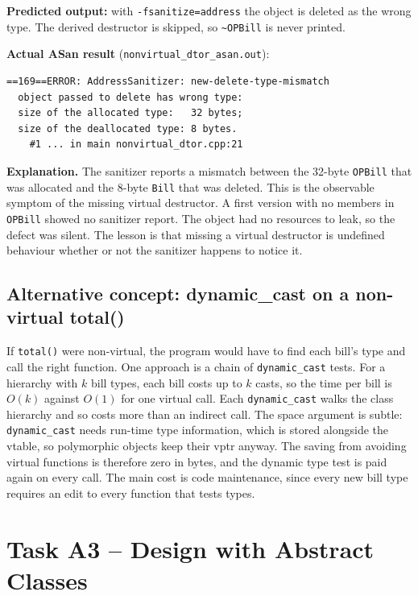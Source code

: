 \documentclass[11pt,a4paper]{article}
\begin{document}
\textbf{Predicted output:} with \texttt{-fsanitize=address} the object is deleted as the wrong type. The derived destructor is skipped, so \texttt{\~{}OPBill} is never printed.

\textbf{Actual ASan result} (\texttt{nonvirtual\_dtor\_asan.out}):
\begin{lstlisting}[style=out]
==169==ERROR: AddressSanitizer: new-delete-type-mismatch
  object passed to delete has wrong type:
  size of the allocated type:   32 bytes;
  size of the deallocated type: 8 bytes.
    #1 ... in main nonvirtual_dtor.cpp:21
\end{lstlisting}

\textbf{Explanation.} The sanitizer reports a mismatch between the 32-byte \texttt{OPBill} that was allocated and the 8-byte \texttt{Bill} that was deleted. This is the observable symptom of the missing virtual destructor. A first version with no members in \texttt{OPBill} showed no sanitizer report. The object had no resources to leak, so the defect was silent. The lesson is that missing a virtual destructor is undefined behaviour whether or not the sanitizer happens to notice it.

\subsection*{Alternative concept: dynamic\_cast on a non-virtual total()}
If \texttt{total()} were non-virtual, the program would have to find each bill's type and call the right function. One approach is a chain of \texttt{dynamic\_cast} tests. For a hierarchy with $k$ bill types, each bill costs up to $k$ casts, so the time per bill is $O(k)$ against $O(1)$ for one virtual call. Each \texttt{dynamic\_cast} walks the class hierarchy and so costs more than an indirect call. The space argument is subtle: \texttt{dynamic\_cast} needs run-time type information, which is stored alongside the vtable, so polymorphic objects keep their vptr anyway. The saving from avoiding virtual functions is therefore zero in bytes, and the dynamic type test is paid again on every call. The main cost is code maintenance, since every new bill type requires an edit to every function that tests types.

\section{Task A3 -- Design with Abstract Classes}
\end{document}
